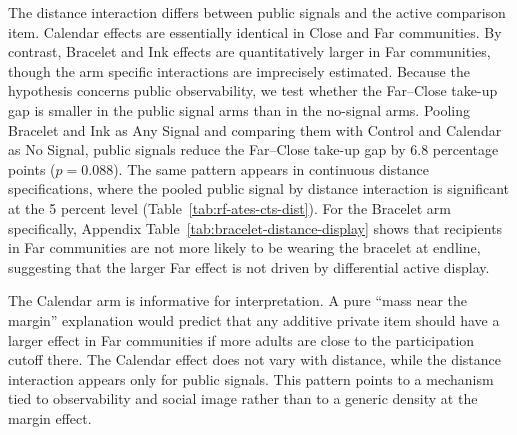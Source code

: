 \documentclass[ECM\space ReStud.tex]{subfiles}
\begin{document}
The distance interaction differs between public signals and the active comparison item. Calendar effects are essentially identical in Close and Far communities. By contrast, Bracelet and Ink effects are quantitatively larger in Far communities, though the arm specific interactions are imprecisely estimated. Because the hypothesis concerns public observability, we test whether the Far--Close take-up gap is smaller in the public signal arms than in the no-signal arms. Pooling Bracelet and Ink as Any Signal and comparing them with Control and Calendar as No Signal, public signals reduce the Far--Close take-up gap by 6.8 percentage points (\(p=0.088\)). The same pattern appears in continuous distance specifications, where the pooled public signal by distance interaction is significant at the 5 percent level (Table~\ref{tab:rf-ates-cts-dist}). For the Bracelet arm specifically, Appendix Table~\ref{tab:bracelet-distance-display} shows that recipients in Far communities are not more likely to be wearing the bracelet at endline, suggesting that the larger Far effect is not driven by differential active display.

The Calendar arm is informative for interpretation. A pure ``mass near the
  margin'' explanation would predict that any additive private item should have a
  larger effect in Far communities if more adults are close to the participation
  cutoff there. The Calendar effect does not vary with distance, while the distance
  interaction appears only for public signals. This pattern points to a mechanism
  tied to observability and social image rather than to a generic density at the
  margin effect.


\end{document}
